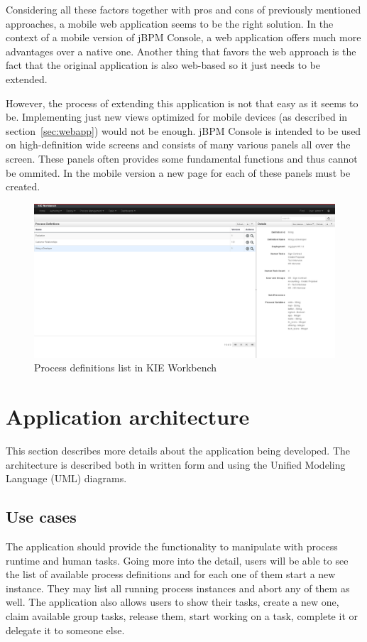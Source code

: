 \documentclass[12pt,oneside,final]{fithesis2}
\begin{document}
Considering all these factors together with pros and cons of previously mentioned approaches, a mobile web application seems to be the right solution.
In the context of a mobile version of jBPM Console, a web application offers much more advantages over a native one.
Another thing that favors the web approach is the fact that the original application is also web-based so it just needs to be extended.

However, the process of extending this application is not that easy as it seems to be.
Implementing just new views optimized for mobile devices (as described in section~\ref{sec:webapp}) would not be enough.
jBPM Console is intended to be used on high-definition wide screens and consists of many various panels\footnotemark{} all over the screen.
These panels often provides some fundamental functions and thus cannot be ommited.
In the mobile version a new page for each of these panels must be created.

\begin{figure}[ht!]
\centering
\includegraphics[width=\textwidth]{images/kie-workbench.png}
\caption{Process definitions list in KIE Workbench}
\label{fig:kie-workbench}
\end{figure}

\section{Application architecture}
This section describes more details about the application being developed.
The architecture is described both in written form and using the Unified Modeling Language (UML) diagrams.

\subsection{Use cases}
The application should provide the functionality to manipulate with process runtime and human tasks.
Going more into the detail, users will be able to see the list of available process definitions and for each one of them start a new instance.
They may list all running process instances and abort any of them as well.
The application also allows users to show their tasks, create a new one, claim available group tasks, release them, start working on a task, complete it or delegate it to someone else.
\end{document}
